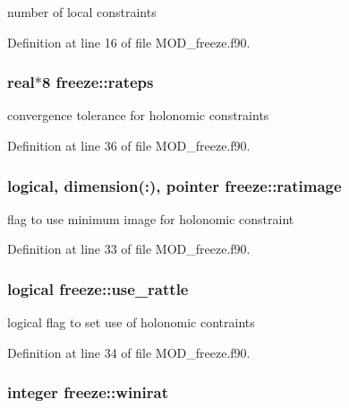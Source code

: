 number of local constraints 



Definition at line 16 of file M\-O\-D\-\_\-freeze.\-f90.

\hypertarget{classfreeze_aa4d3247ab1f305e1059bd93bbb33e394}{
\subsubsection[{rateps}]{\setlength{\rightskip}{0pt plus 5cm}real$\ast$8 freeze\-::rateps}}\label{classfreeze_aa4d3247ab1f305e1059bd93bbb33e394}


convergence tolerance for holonomic constraints 



Definition at line 36 of file M\-O\-D\-\_\-freeze.\-f90.

\hypertarget{classfreeze_a07586f65c5462b97a2f1b6a9ff6a0616}{
\subsubsection[{ratimage}]{\setlength{\rightskip}{0pt plus 5cm}logical, dimension(\-:), pointer freeze\-::ratimage}}\label{classfreeze_a07586f65c5462b97a2f1b6a9ff6a0616}


flag to use minimum image for holonomic constraint 



Definition at line 33 of file M\-O\-D\-\_\-freeze.\-f90.

\hypertarget{classfreeze_a2f54ed0af4a00111bc9bebd6f458247f}{
\subsubsection[{use\-\_\-rattle}]{\setlength{\rightskip}{0pt plus 5cm}logical freeze\-::use\-\_\-rattle}}\label{classfreeze_a2f54ed0af4a00111bc9bebd6f458247f}


logical flag to set use of holonomic contraints 



Definition at line 34 of file M\-O\-D\-\_\-freeze.\-f90.

\hypertarget{classfreeze_af6cca7e43f620ad05cae4791a3217687}{
\subsubsection[{winirat}]{\setlength{\rightskip}{0pt plus 5cm}integer freeze\-::winirat}}\label{classfreeze_af6cca7e43f620ad05cae4791a3217687}


